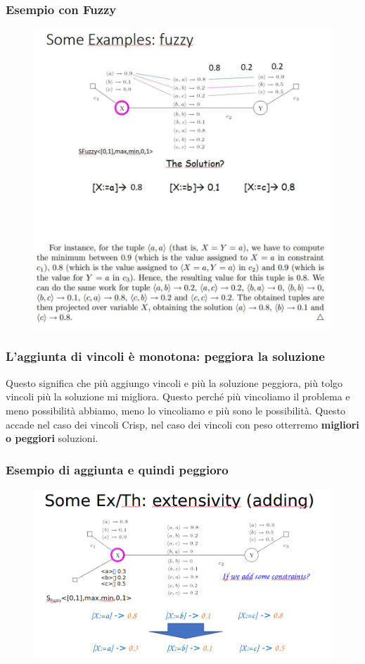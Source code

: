 \subsubsection{Esempio con Fuzzy}
\begin{figure}[H]
    \centering
    \includegraphics[width=14cm, keepaspectratio]{img/Cap4/fuzzy.png}
\end{figure}

\newpage
\subsubsection{L'aggiunta di vincoli è monotona: peggiora la soluzione}
Questo significa che più aggiungo vincoli e più la soluzione peggiora, più tolgo vincoli più la soluzione mi migliora. Questo perché più vincoliamo il problema e meno possibilità abbiamo, meno lo vincoliamo e più sono le possibilità. Questo accade nel caso dei vincoli Crisp, nel caso dei vincoli con peso otterremo \textbf{migliori o peggiori} soluzioni.
\subsubsection{Esempio di aggiunta e quindi peggioro}
\begin{figure}[H]
    \centering
    \includegraphics[width=12.5cm, keepaspectratio]{img/Cap4/worst2.png}
\end{figure}

